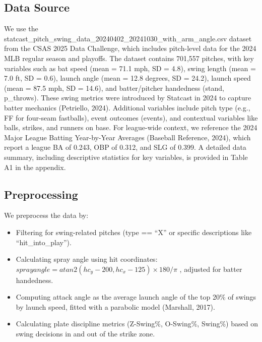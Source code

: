 \documentclass[
]{article}
\providecommand{\tightlist}{%
  \setlength{\itemsep}{0pt}\setlength{\parskip}{0pt}}
\begin{document}
\hypertarget{data-source}{%
\subsection{Data Source}\label{data-source}}

We use the
statcast\_pitch\_swing\_data\_20240402\_20241030\_with\_arm\_angle.csv
dataset from the CSAS 2025 Data Challenge, which includes pitch-level
data for the 2024 MLB regular season and playoffs. The dataset contains
701,557 pitches, with key variables such as bat speed (mean = 71.1 mph,
SD = 4.8), swing length (mean = 7.0 ft, SD = 0.6), launch angle (mean =
12.8 degrees, SD = 24.2), launch speed (mean = 87.5 mph, SD = 14.6), and
batter/pitcher handedness (stand, p\_throws). These swing metrics were
introduced by Statcast in 2024 to capture batter mechanics (Petriello,
2024). Additional variables include pitch type (e.g., FF for four-seam
fastballs), event outcomes (events), and contextual variables like
balls, strikes, and runners on base. For league-wide context, we
reference the 2024 Major League Batting Year-by-Year Averages (Baseball
Reference, 2024), which report a league BA of 0.243, OBP of 0.312, and
SLG of 0.399. A detailed data summary, including descriptive statistics
for key variables, is provided in Table A1 in the appendix.

\hypertarget{preprocessing}{%
\subsection{Preprocessing}\label{preprocessing}}

We preprocess the data by:

\begin{itemize}
\tightlist
\item
  Filtering for swing-related pitches (type == ``X'' or specific
  descriptions like ``hit\_into\_play'').
\item
  Calculating spray angle using hit coordinates:
  \(sprayangle = atan2(hc_y - 200, hc_x - 125) \times 180 / \pi\) ,
  adjusted for batter handedness.
\item
  Computing attack angle as the average launch angle of the top 20\% of
  swings by launch speed, fitted with a parabolic model (Marshall,
  2017).
\item
  Calculating plate discipline metrics (Z-Swing\%, O-Swing\%, Swing\%)
  based on swing decisions in and out of the strike zone.
\end{itemize}
\end{document}
